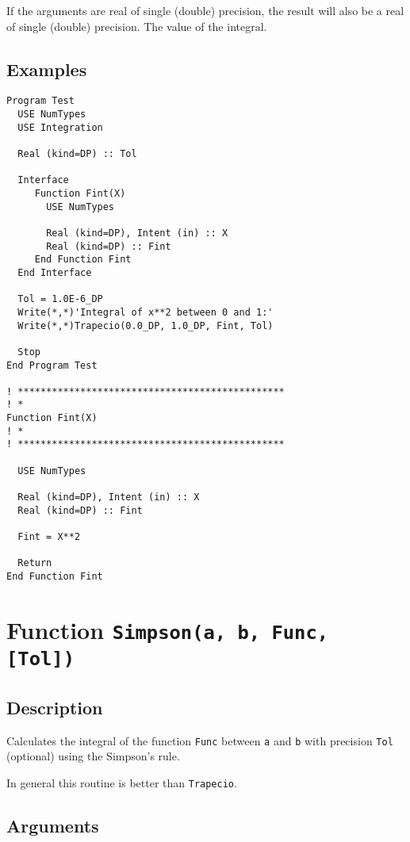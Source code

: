 If the arguments are real of single (double) precision, the result
will also be a real of single (double) precision. The value of the
integral. 


\subsection{Examples}

\begin{verbatim}
Program Test
  USE NumTypes
  USE Integration

  Real (kind=DP) :: Tol

  Interface 
     Function Fint(X)
       USE NumTypes

       Real (kind=DP), Intent (in) :: X
       Real (kind=DP) :: Fint
     End Function Fint
  End Interface

  Tol = 1.0E-6_DP
  Write(*,*)'Integral of x**2 between 0 and 1:'
  Write(*,*)Trapecio(0.0_DP, 1.0_DP, Fint, Tol)

  Stop
End Program Test

! ***********************************************
! *
Function Fint(X)
! *  
! ***********************************************

  USE NumTypes

  Real (kind=DP), Intent (in) :: X
  Real (kind=DP) :: Fint

  Fint = X**2

  Return
End Function Fint
\end{verbatim}

\section{Function \texttt{Simpson(a, b, Func, [Tol])}}

\subsection{Description}

Calculates the integral of the function \texttt{Func} between
\texttt{a} and \texttt{b} with precision \texttt{Tol} (optional) using
the Simpson's rule.

In general this routine is better than \texttt{Trapecio}.

\subsection{Arguments}

